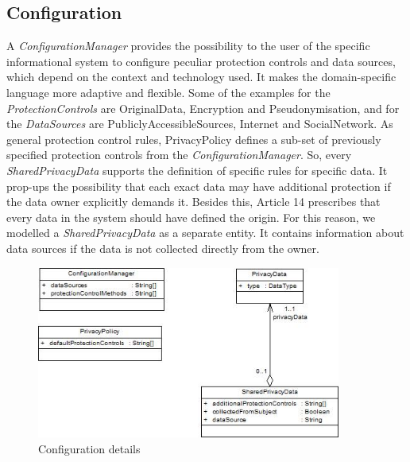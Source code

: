 \documentclass[11pt,english]{article}
\begin{document}
\subsection{Configuration}
A \emph{ConfigurationManager} provides the possibility to the user of the specific informational system to configure peculiar protection controls and data sources, which depend on the context and technology used. It makes the domain-specific language more adaptive and flexible. Some of the examples for the \emph{ProtectionControls} are OriginalData, Encryption and Pseudonymisation, and for the \emph{DataSources} are PubliclyAccessibleSources, Internet and SocialNetwork. As general protection control rules, PrivacyPolicy defines a sub-set of previously specified protection controls from the \emph{ConfigurationManager}. So, every \emph{SharedPrivacyData} supports the definition of specific rules for specific data. It prop-ups the possibility that each exact data may have additional protection if the data owner explicitly demands it. Besides this, Article 14 prescribes that every data in the system should have defined the origin. For this reason, we modelled a \emph{SharedPrivacyData} as a separate entity. It contains information about data sources if the data is not collected directly from the owner.
\begin{figure}[H]
    \centering
    \includegraphics[width=10cm,scale=0.5]{images/configuration.jpg}
    \caption{Configuration details}
    \label{fig:configuration}
\end{figure}
\end{document}
